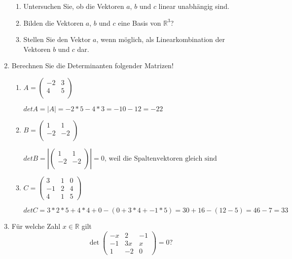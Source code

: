 \documentclass[12pt,a4paper]{scrreprt}
\newcommand{\R}{\mathds{R}}
\begin{document}
\begin{enumerate}
	\begin{enumerate}
		\item Untersuchen Sie, ob die Vektoren $a$, $b$ und $c$ linear unabhängig sind.
		\item Bilden die Vektoren $a$, $b$ und $c$ eine Basis von $\R^3$?
		\item Stellen Sie den Vektor $a$, wenn möglich, als Linearkombination der Vektoren $b$ und $c$ dar.
	\end{enumerate}

\item Berechnen Sie die Determinanten folgender Matrizen!
	\begin{enumerate}
		\item $A=\begin{pmatrix}
			-2 & 3  \\
			4 & 5\\
		\end{pmatrix}$

$det A=|A|=-2*5-4*3=-10-12 = -22$

		\item  $B=\begin{pmatrix}
			1 & 1   \\
			-2 & -2\\
		\end{pmatrix}$

$det B	=	|\begin{pmatrix}
			1 & 1   \\
			-2 & -2\\
		\end{pmatrix}|
	= 0 \text{, weil die Spaltenvektoren gleich sind}$

		\item $C=\begin{pmatrix}
			3 	& 1 	& 0  \\
			-1 	& 2 	& 4 \\
			4 	& 1 	& 5
		\end{pmatrix}$

$
det C	= 3*2*5 + 4*4 + 0 - ( 0 + 3*4 + -1*5) = 30+16-(12-5) = 46-7=33
$

	\end{enumerate}
	\item Für welche Zahl $x \in \R$ gilt
	\[
    	\det \begin{pmatrix}
			-x & 2 & -1 \\
			-1 & 3x & x \\
			1 & -2 & 0
		\end{pmatrix} =0?
	\]


\end{enumerate}
\end{document}
